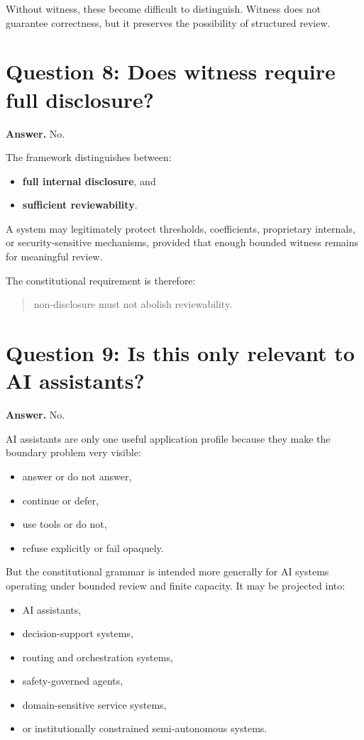 \documentclass[11pt]{article}
\begin{document}
Without witness, these become difficult to distinguish. Witness does not guarantee correctness, but it preserves the possibility of structured review.

\section{Question 8: Does witness require full disclosure?}

\textbf{Answer.} No.

The framework distinguishes between:
\begin{itemize}[leftmargin=2em]
    \item \textbf{full internal disclosure}, and
    \item \textbf{sufficient reviewability}.
\end{itemize}

A system may legitimately protect thresholds, coefficients, proprietary internals, or security-sensitive mechanisms, provided that enough bounded witness remains for meaningful review.

The constitutional requirement is therefore:
\begin{quote}
non-disclosure must not abolish reviewability.
\end{quote}

\section{Question 9: Is this only relevant to AI assistants?}

\textbf{Answer.} No.

AI assistants are only one useful application profile because they make the boundary problem very visible:
\begin{itemize}[leftmargin=2em]
    \item answer or do not answer,
    \item continue or defer,
    \item use tools or do not,
    \item refuse explicitly or fail opaquely.
\end{itemize}

But the constitutional grammar is intended more generally for AI systems operating under bounded review and finite capacity. It may be projected into:
\begin{itemize}[leftmargin=2em]
    \item AI assistants,
    \item decision-support systems,
    \item routing and orchestration systems,
    \item safety-governed agents,
    \item domain-sensitive service systems,
    \item or institutionally constrained semi-autonomous systems.
\end{itemize}
\end{document}
